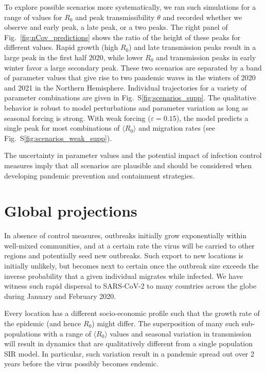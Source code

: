 \documentclass[rmp, reprint, superscriptaddress, floatfix,amsmath]{revtex4-1}
\newcommand{\forcing}{\varepsilon}
\begin{document}
To explore possible scenarios more systematically, we ran such simulations for a range of values for $R_0$ and peak transmissibility $\theta$ and recorded whether we observe and early peak, a late peak, or a two peaks. 
The right panel of Fig.~\ref{fig:nCov_predictions} shows the ratio of the height of these peaks for different values.
Rapid growth (high $R_0$) and late transmission peaks result in a large peak in the first half 2020, while lower $R_0$ and transmission peaks in early winter favor a large secondary peak. 
These two scenarios are separated by a band of parameter values that give rise to two pandemic waves in the winters of 2020 and 2021 in the Northern Hemisphere.
Individual trajectories for a variety of parameter combinations are given in Fig.~S\ref{fig:scenarios_supp}.
The qualitative behavior is robust to model perturbations and parameter variation as long as seasonal forcing is strong. 
With weak forcing ($\forcing=0.15$), the model predicts a single peak for most combinations of $\langle R_0 \rangle$ and migration rates (see Fig.~S\ref{fig:scenarios_weak_supp}).

The uncertainty in parameter values and the potential impact of infection control measures imply that all scenarios are plausible and should be considered when developing pandemic prevention and containment strategies.


\section{Global projections}
In absence of control measures, outbreaks initially grow exponentially within well-mixed communities, and at a certain rate the virus will be carried to other regions and potentially seed new outbreaks. 
Such export to new locations is initially unlikely, but becomes next to certain once the outbreak size exceeds the inverse probability that a given individual migrates while infected.
We have witness such rapid dispersal to SARS-CoV-2 to many countries across the globe during January and February 2020.

Every location has a different socio-economic profile such that the growth rate of the epidemic (and hence $R_0$) might differ. 
The superposition of many such sub-populations with a range of $\langle R_0 \rangle$ values and seasonal variation in transmission will result in dynamics that are qualitatively different from a single population SIR model. 
In particular, such variation result in a pandemic spread out over 2 years before the virus possibly becomes endemic. 
\end{document}
